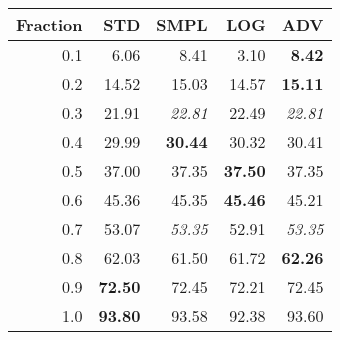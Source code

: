 \documentclass{standalone}
\begin{document}
\begin{tabular}{r|rrrr}
      \toprule
      Fraction & STD & SMPL & LOG & ADV\\
      \midrule
      0.1 & 6.06 & 8.41 & 3.10 & \textbf{8.42}\\
  0.2 & 14.52 & 15.03 & 14.57 & \textbf{15.11}\\
  0.3 & 21.91 & \emph{22.81} & 22.49 & \emph{22.81}\\
  0.4 & 29.99 & \textbf{30.44} & 30.32 & 30.41\\
  0.5 & 37.00 & 37.35 & \textbf{37.50} & 37.35\\
  0.6 & 45.36 & 45.35 & \textbf{45.46} & 45.21\\
  0.7 & 53.07 & \emph{53.35} & 52.91 & \emph{53.35}\\
  0.8 & 62.03 & 61.50 & 61.72 & \textbf{62.26}\\
  0.9 & \textbf{72.50} & 72.45 & 72.21 & 72.45\\
  1.0 & \textbf{93.80} & 93.58 & 92.38 & 93.60\\
  \bottomrule
\end{tabular}
\end{document}
